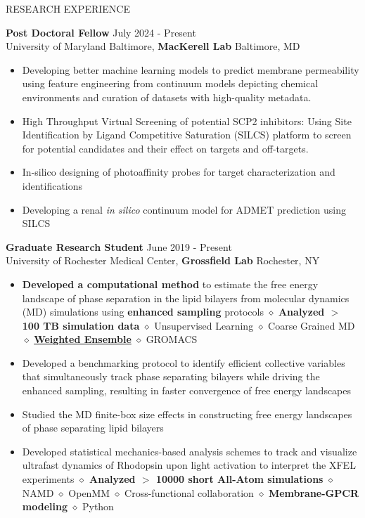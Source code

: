 \documentclass{resume} %
\begin{document}
\begin{rSection}{RESEARCH EXPERIENCE}

   \textbf{Post Doctoral Fellow} \hfill July 2024 - Present\\
   University of Maryland Baltimore, \textbf{MacKerell Lab} \hfill Baltimore, MD
   \begin{itemize}
      \itemsep -1pt {}
      \item Developing better machine learning models to predict membrane permeability using feature engineering from continuum models depicting chemical environments and curation of datasets with high-quality metadata. 
      \item High Throughput Virtual Screening of potential SCP2 inhibitors: Using Site Identification by Ligand Competitive Saturation (SILCS) platform to screen for potential candidates and their effect on targets and off-targets.
      \item In-silico designing of photoaffinity probes for target characterization and identifications
      \item Developing a renal \textit{in silico} continuum model for ADMET prediction using SILCS
   \end{itemize}

   \textbf{Graduate Research Student} \hfill June 2019 - Present\\
   University of Rochester Medical Center, \textbf{Grossfield Lab} \hfill Rochester, NY
   \begin{itemize}
      \itemsep -1pt {}
      \item \textbf{Developed a computational method} to estimate the free energy landscape of phase separation in the lipid bilayers from molecular dynamics (MD) simulations using \textbf{enhanced sampling} protocols
            $\diamond$ \textbf{Analyzed $>$ 100 TB simulation data} $\diamond$ Unsupervised Learning $\diamond$ Coarse Grained MD $\diamond$ \textbf{\href{https://x.com/poruthoor/status/1631815905557479426?s=20}{Weighted Ensemble}} $\diamond$ GROMACS
      \item Developed a benchmarking protocol to identify efficient collective variables that simultaneously track phase separating bilayers while driving the enhanced sampling, resulting in faster convergence of free energy landscapes
      \item Studied the MD finite-box size effects in constructing free energy landscapes of phase separating lipid bilayers
      \item Developed statistical mechanics-based analysis schemes to track and visualize ultrafast dynamics of Rhodopsin upon light activation to interpret the XFEL experiments \textbf{$\diamond$ Analyzed $>$ 10000 short All-Atom simulations}
            $\diamond$ NAMD $\diamond$ OpenMM $\diamond$ Cross-functional collaboration $\diamond$  \textbf{Membrane-GPCR modeling} $\diamond$ Python
   \end{itemize}


\end{rSection}
\end{document}
